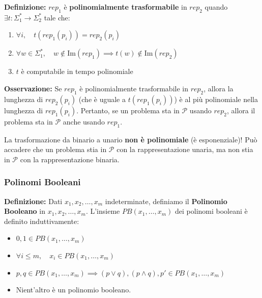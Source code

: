 \textbf{Definizione:} $rep_1$ è \textbf{polinomialmente trasformabile} in $rep_2$ quando $\exists t: \Sigma_1^* \to \Sigma_2^*$ tale che:
\begin{enumerate}
    \item[i)] $\forall i, \quad t(rep_1(p_i)) = rep_2(p_i)$
    \item[ii)] $\forall w \in \Sigma_1^*, \quad w \notin \text{Im}(rep_1) \implies t(w) \notin \text{Im}(rep_2)$
    \item[iii)] $t$ è computabile in tempo polinomiale
\end{enumerate}

\vspace{0.4cm}
\textbf{Osservazione:} Se $rep_1$ è polinomialmente trasformabile in $rep_2$, allora la lunghezza di $rep_2(p_i)$ (che è uguale a $t(rep_1(p_i))$) è al più polinomiale nella lunghezza di $rep_1(p_i)$. Pertanto, se un problema sta in $\mathcal{P}$ usando $rep_2$, allora il problema sta in $\mathcal{P}$ anche usando $rep_1$.

\begin{center}
\end{center}
La trasformazione da binario a unario \textbf{non è polinomiale} (è esponenziale)!
Può accadere che un problema stia in $\mathcal{P}$ con la rappresentazione unaria, ma non stia in $\mathcal{P}$ con la rappresentazione binaria.


\vspace{0.8cm}
\subsubsection{Polinomi Booleani}

\textbf{Definizione:} Dati $x_1, x_2, \dots, x_m$ indeterminate, definiamo il \textbf{Polinomio Booleano} in $x_1, x_2, \dots, x_m$. L'insieme $PB(x_1, \dots, x_m)$ dei polinomi booleani è definito induttivamente:
\begin{itemize}
    \item $0, 1 \in PB(x_1, \dots, x_m)$
    \item $\forall i \le m, \quad x_i \in PB(x_1, \dots, x_m)$
    \item $p, q \in PB(x_1, \dots, x_m) \implies (p \lor q), (p \land q), p' \in PB(x_1, \dots, x_m)$
    \item Nient'altro è un polinomio booleano.
\end{itemize}

